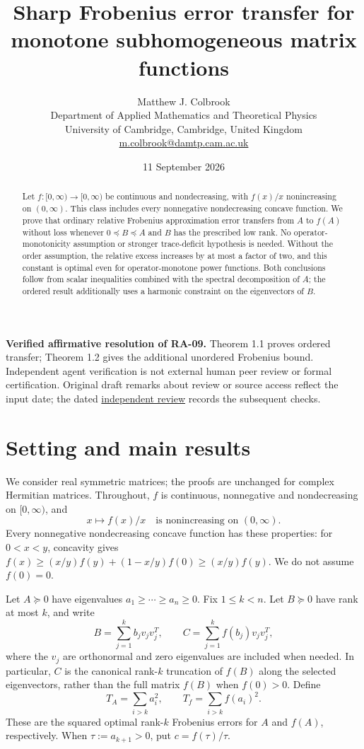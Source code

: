 \documentclass[11pt]{article}
\title{Sharp Frobenius error transfer for monotone subhomogeneous matrix functions}
\author{Matthew J. Colbrook\\\small Department of Applied Mathematics and Theoretical Physics\\\small University of Cambridge, Cambridge, United Kingdom\\\small\href{mailto:m.colbrook@damtp.cam.ac.uk}{m.colbrook@damtp.cam.ac.uk}}
\date{11 September 2026}
\theoremstyle{definition}
\newcommand{\TA}{T_A}
\newcommand{\Tf}{T_f}
\begin{document}
\maketitle

\noindent\textbf{Verified affirmative resolution of RA-09.} Theorem 1.1 proves ordered transfer; Theorem 1.2 gives the additional unordered Frobenius bound.
Independent agent verification is not external human peer review or formal certification. Original draft remarks about review or source access reflect the input date; the dated \href{https://github.com/MColbrook/OpenProblemsInNLA/blob/codex/colbrook-transfer-resolutions/references/colbrook-transfer-2026-09-11/verification/reviews/RA-09-review.md}{independent review} records the subsequent checks.
\par\medskip
\begin{abstract}
Let $f:[0,\infty)\to[0,\infty)$ be continuous and nondecreasing, with $f(x)/x$ nonincreasing on $(0,\infty)$. This class includes every nonnegative nondecreasing concave function. We prove that ordinary relative Frobenius approximation error transfers from $A$ to $f(A)$ without loss whenever $0\preceq B\preceq A$ and $B$ has the prescribed low rank. No operator-monotonicity assumption or stronger trace-deficit hypothesis is needed. Without the order assumption, the relative excess increases by at most a factor of two, and this constant is optimal even for operator-monotone power functions. Both conclusions follow from scalar inequalities combined with the spectral decomposition of $A$; the ordered result additionally uses a harmonic constraint on the eigenvectors of $B$.
\end{abstract}

\section{Setting and main results}
We consider real symmetric matrices; the proofs are unchanged for complex Hermitian matrices. Throughout, $f$ is continuous, nonnegative and nondecreasing on $[0,\infty)$, and
\begin{equation}\label{eq:subhom}
 x\longmapsto f(x)/x\quad\text{is nonincreasing on }(0,\infty).
\end{equation}
Every nonnegative nondecreasing concave function has these properties: for $0<x<y$, concavity gives $f(x)\ge (x/y)f(y)+(1-x/y)f(0)\ge(x/y)f(y)$. We do not assume $f(0)=0$.

Let $A\succeq0$ have eigenvalues $a_1\ge\cdots\ge a_n\ge0$. Fix $1\le k<n$. Let $B\succeq0$ have rank at most $k$, and write
\[
 B=\sum_{j=1}^k b_jv_jv_j^T,\qquad
 C=\sum_{j=1}^k f(b_j)v_jv_j^T,
\]
where the $v_j$ are orthonormal and zero eigenvalues are included when needed. In particular, $C$ is the canonical rank-$k$ truncation of $f(B)$ along the selected eigenvectors, rather than the full matrix $f(B)$ when $f(0)>0$. Define
\[
 \TA=\sum_{i>k}a_i^2,\qquad
 \Tf=\sum_{i>k}f(a_i)^2.
\]
These are the squared optimal rank-$k$ Frobenius errors for $A$ and $f(A)$, respectively. When $\tau:=a_{k+1}>0$, put $c=f(\tau)/\tau$.
\end{document}
